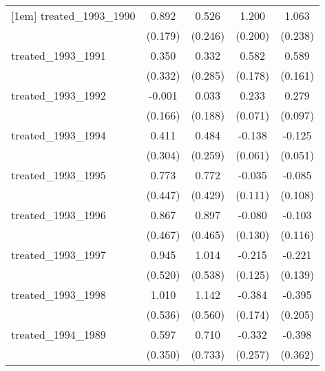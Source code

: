 {\begin{tabular}{l*{4}{c}}
[1em]
treated\_1993\_1990&       0.892\sym{***}&       0.526\sym{*}  &       1.200\sym{***}&       1.063\sym{***}\\
            &     (0.179)         &     (0.246)         &     (0.200)         &     (0.238)         \\
[1em]
treated\_1993\_1991&       0.350         &       0.332         &       0.582\sym{**} &       0.589\sym{***}\\
            &     (0.332)         &     (0.285)         &     (0.178)         &     (0.161)         \\
[1em]
treated\_1993\_1992&      -0.001         &       0.033         &       0.233\sym{***}&       0.279\sym{**} \\
            &     (0.166)         &     (0.188)         &     (0.071)         &     (0.097)         \\
[1em]
treated\_1993\_1994&       0.411         &       0.484         &      -0.138\sym{*}  &      -0.125\sym{*}  \\
            &     (0.304)         &     (0.259)         &     (0.061)         &     (0.051)         \\
[1em]
treated\_1993\_1995&       0.773         &       0.772         &      -0.035         &      -0.085         \\
            &     (0.447)         &     (0.429)         &     (0.111)         &     (0.108)         \\
[1em]
treated\_1993\_1996&       0.867         &       0.897         &      -0.080         &      -0.103         \\
            &     (0.467)         &     (0.465)         &     (0.130)         &     (0.116)         \\
[1em]
treated\_1993\_1997&       0.945         &       1.014         &      -0.215         &      -0.221         \\
            &     (0.520)         &     (0.538)         &     (0.125)         &     (0.139)         \\
[1em]
treated\_1993\_1998&       1.010         &       1.142\sym{*}  &      -0.384\sym{*}  &      -0.395         \\
            &     (0.536)         &     (0.560)         &     (0.174)         &     (0.205)         \\
[1em]
treated\_1994\_1989&       0.597         &       0.710         &      -0.332         &      -0.398         \\
            &     (0.350)         &     (0.733)         &     (0.257)         &     (0.362)         \\

\end{tabular}}
